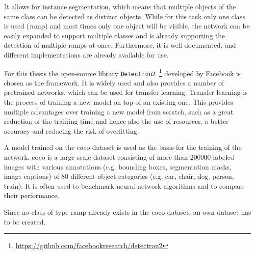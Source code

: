 It allows for instance segmentation, which means that multiple objects of the same class can be detected as distinct objects.
While for this task only one class is used (ramp) and most times only one object will be visible, the network can be easily expanded to support multiple classes and is already supporting the detection of multiple ramps at once.
Furthermore, it is well documented, and different implementations are already available for use.\par
For this thesis the open-source library \texttt{Detectron2}~\footnote{\url{https://github.com/facebookresearch/detectron2}} \cite{Wu2019} developed by Facebook is chosen as the framework.
It is widely used and also provides a number of pretrained networks, which can be used for transfer learning.
Transfer learning is the process of training a new model on top of an existing one.
This provides multiple advantages over training a new model from scratch, such as a great reduction of the training time and hence also the use of resources, a better accuracy and reducing the risk of overfitting.\par
A model trained on the \gls{coco} dataset \cite{Lin2014} is used as the basis for the training of the network.
\gls{coco} is a large-scale dataset consisting of more than \num{200000} labeled images with various annotations (e.g. bounding boxes, segmentation masks, image captions) of 80 different object categories (e.g. car, chair, dog, person, train).
It is often used to benchmark neural network algorithms and to compare their performance.\par
Since no class of type ramp already exists in the \gls{coco} dataset, an own dataset has to be created.


